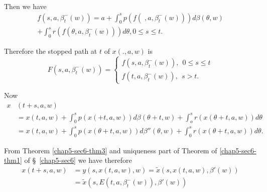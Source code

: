 Then we have 
\begin{multline*}
f(s, a, \beta^-_t (w)) = a +  \int^s_0 p(f(\; , a, \beta^-_t(w)))d \beta
  (\theta , w)\\ 
  +\int^s_0 r (f(\theta , a, \beta^-_t (w)))d \theta, 0
  \leq s \leq t. 
\end{multline*}

Therefore the stopped path at $t$ of $x( . , a, w)$ is 
\begin{equation*}
  F(s, a, \beta^-_t (w)) = 
  \begin{cases}
    f(s, a, \beta^-_t (w)),\ \ 0 \leq s \leq t\\
    f(t, a, \beta^-_t (w)),\ \  s > t.
  \end{cases}
\end{equation*}

Now
\begin{align*}
  x& (t + s, a, w) \\
  & = x(t, a, w) +  \int^s_0 p (x( + t, a, w)) d \beta
  (\theta + t, w)+  \int^s_o r (x(\theta + t, a, w)) d \theta\\
  & =x(t, a, w) +  \int^s_0 p(x (\theta + t, a, w)) d \beta{''}
  (\theta, w)+  \int^s_0 r(x(\theta + t, a,w)) d \theta. 
\end{align*}

From Theorem \ref{chap5-sec6-thm3} and uniqueness part of Theorem of
\ref{chap5-sec6-thm1} of \S\ \ref{chap5-sec6} we have therefore 
\begin{align*}
  x(t + s, a, w) &= y(s, x (t, a, w), w) = \tilde{x}(s, x(t, a, w),
  \beta{'} (w))\\ 
  &= \tilde{x}(s, E (t, a, \beta^-_t (w)), \beta{'} (w))
\end{align*}

